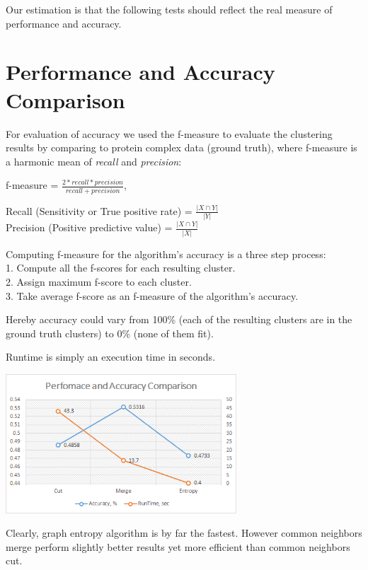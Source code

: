 \documentclass[journal]{IEEEtran}
\begin{document}
Our estimation is that the following tests should reflect the real measure of performance and accuracy.



\section{Performance and Accuracy Comparison}
For evaluation of accuracy we used the f-measure to evaluate the clustering results by comparing to protein complex data (ground truth), where f-measure is a harmonic mean of \textit{recall} and \textit{precision}:
\begin{center}
	f-measure = $\frac{2 * recall * precision}{recall + precision} $,\\	
\end{center} 
Recall (Sensitivity or True positive rate) = $\frac{|X \cap Y|}{|Y|}$\\
Precision (Positive predictive value) =  $\frac{|X \cap Y|}{|X|}$

Computing f-measure for the algorithm's accuracy is a three step process:\\
1. Compute all the f-scores for each resulting cluster.\\
2. Assign maximum f-score to each cluster.\\
3. Take average f-score as an f-measure of the algorithm's accuracy. 

Hereby accuracy could vary from 100\% (each of the resulting clusters are in the ground truth clusters) to 0\% (none of them fit).

Runtime is simply an execution time in seconds.

\includegraphics[width=3.4in,clip,keepaspectratio]{perfomance-comparison}

Clearly, graph entropy algorithm is by far the fastest. However common neighbors merge perform slightly better results yet more efficient than common neighbors cut. 
\end{document}
